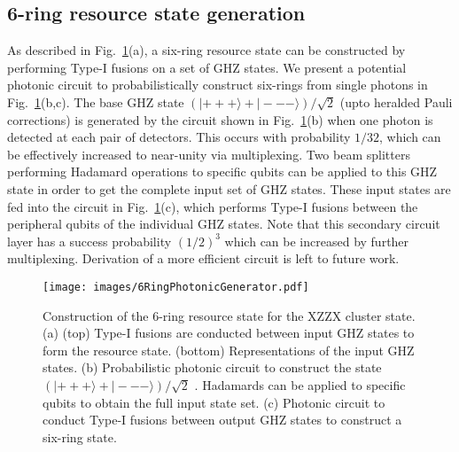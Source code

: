 \documentclass[reprint,
groupedaddress,
 prl,amsmath,amssymb,
 aps]{revtex4-2}
\theoremstyle{definition}
\begin{document}
\begin{bibunit}
\section{6-ring resource state generation}
As described in Fig.~\ref{fig:6ringcircuit}(a), a six-ring resource state can be  constructed by performing Type-I fusions \cite{browne2005resource} on a set of GHZ states. We present a potential photonic circuit to probabilistically construct six-rings from single photons in Fig.~\ref{fig:6ringcircuit}(b,c).  The base GHZ state 
 $\left(|+++\rangle + |---\rangle \right)/ \sqrt{2}$ (upto heralded Pauli corrections) is generated by the  circuit shown in  Fig.~\ref{fig:6ringcircuit}(b) when one photon is detected at each pair of detectors. This occurs with probability $1/32$, which can be effectively increased to near-unity via multiplexing. Two beam splitters performing Hadamard operations to specific qubits can be applied to this GHZ state in order to get the complete input set of GHZ states. These input states are fed into the circuit in  Fig.~\ref{fig:6ringcircuit}(c), which performs Type-I fusions between the peripheral qubits of the individual GHZ states. Note that this secondary circuit layer has a success probability $(1/2)^3 $ which can be increased by further multiplexing. Derivation of a more efficient circuit is left to future work.
\begin{figure}[ht]
    \centering
    \texttt{[image: images/6RingPhotonicGenerator.pdf]}
    \caption{Construction of the 6-ring resource state for the XZZX cluster state. (a) (top) Type-I fusions are conducted between input GHZ states to form the resource state. (bottom) Representations of the input GHZ states. (b) Probabilistic photonic circuit to construct the state $\left(|+++\rangle + |---\rangle \right)/ \sqrt{2}$ \cite{li2015resource}. Hadamards can be applied to specific qubits to obtain the full input state set. (c) Photonic circuit to conduct Type-I fusions between output GHZ states to construct a six-ring state.}
    \label{fig:6ringcircuit}
\end{figure}


\end{bibunit}
\end{document}
